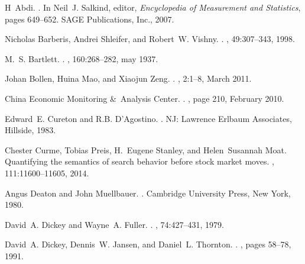 \documentclass[10pt]{article}
\begin{document}
\begin{thebibliography}{10}

H~Abdi.
.
\newblock In Neil~J. Salkind, editor, {\em Encyclopedia of Measurement and
  Statistics}, pages 649--652. SAGE Publications, Inc., 2007.

Nicholas Barberis, Andrei Shleifer, and Robert~W. Vishny.
.
, 49:307--343, 1998.

M.~S. Bartlett.
.
, 160:268--282, may 1937.

Johan Bollen, Huina Mao, and Xiaojun Zeng.
.
, 2:1--8, March 2011.

China Economic Monitoring \&~Analysis Center.
.
, page 210, February 2010.

Edward~E. Cureton and R.B. D'Agostino.
.
\newblock NJ: Lawrence Erlbaum Associates, Hillside, 1983.

Chester Curme, Tobias Preis, H.~Eugene Stanley, and Helen~Susannah Moat.
\newblock Quantifying the semantics of search behavior before stock market
  moves.
,
  111:11600--11605, 2014.

Angus Deaton and John Muellbauer.
.
\newblock Cambridge University Press, New York, 1980.

David~A. Dickey and Wayne~A. Fuller.
.
, 74:427--431,
  1979.

David~A. Dickey, Dennis~W. Jansen, and Daniel~L. Thornton.
.
, pages 58--78, 1991.


\end{thebibliography}
\end{document}
